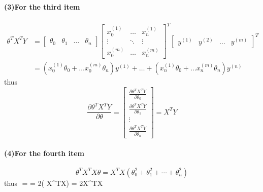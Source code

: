 \documentclass[UTF8]{article}
\begin{document}
\paragraph{(3)For the third item}
\begin{align*}
  \theta^T X^TY &=
  \left[
  \begin{matrix}
    \theta_0 & \theta_1 & \dots & \theta_n
  \end{matrix}
  \right]
  \left[
  \begin{matrix}
      x_0^{(1)} & \dots &x_n^{(1)} \\
      \vdots & \ddots & \vdots \\
      x_0^{(m)} & \dots & x_n^{(m)}
  \end{matrix}
 \right]^T
 \left[
 \begin{matrix}
 y^{(1)} & y^{(2)} & \dots & y^{(m)}
 \end{matrix}
 \right]^T \\
  &= \left(x_0^{(1)}\theta_0 + \dots x_0^{(m)}\theta_n \right)y^{(1)}
  + \dots + \left(x_n^{(1)}\theta_0 + \dots x_n^{(m)}\theta_n \right)y^{(n)}
\end{align*}
thus
$$
\frac{\partial \theta^T X^TY}{\partial\theta} = \left[
\begin{matrix}
  \frac{\partial \theta^T X^TY}{\partial\theta_0} \\
  \frac{\partial \theta^T X^TY}{\partial\theta_1} \\
  \vdots \\
  \frac{\partial \theta^T X^TY}{\partial\theta_n}
\end{matrix}
\right] = X^TY
$$

\paragraph{(4)For the fourth item}
$$
\theta^TX^TX\theta = X^TX\left( \theta_0^2 + \theta_1^2 +\cdots + \theta_n^2 \right)
$$
thus
$$
 =  = 2\left( X^TX\right)
\left[
  \begin{matrix}
    \theta_0 \\
    \theta_1 \\
    \vdots \\
    \theta_n
  \end{matrix}}
\right] = 2X^TX\theta
$$
\end{document}
